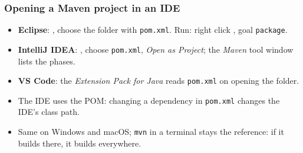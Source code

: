 \documentclass[aspectratio=169,10pt,compress]{beamer}
\begin{document}
\begin{frame}[t,fragile] \frametitle{Opening a Maven project in an IDE}
  \begin{itemize}\small
    \item \textbf{Eclipse}: , choose the folder with \texttt{pom.xml}. Run: right click , goal \texttt{package}.
    \item \textbf{IntelliJ IDEA}: , choose \texttt{pom.xml}, \emph{Open as Project}; the \emph{Maven} tool window lists the phases.
    \item \textbf{VS Code}: the \emph{Extension Pack for Java} reads \texttt{pom.xml} on opening the folder.
    \item The IDE uses the POM: changing a dependency in \texttt{pom.xml} changes the IDE's class path.
    \item Same on Windows and macOS; \texttt{mvn} in a terminal stays the reference: if it builds there, it builds everywhere.
  \end{itemize}
\end{frame}

\end{document}
